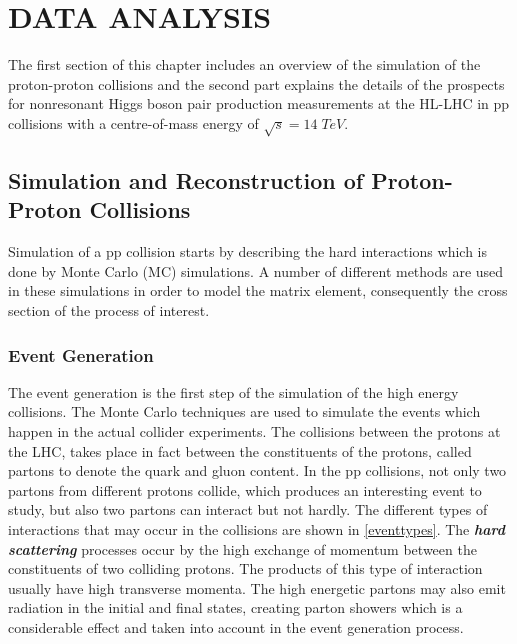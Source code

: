 \chapter{DATA ANALYSIS}\label{ch3}

The first section of this chapter includes an overview of the simulation of the proton-proton collisions and the second part explains the details of the prospects for nonresonant Higgs boson pair production measurements at the HL-LHC in pp collisions with a centre-of-mass energy of $\sqrt{s}=14\;TeV$.

\section{Simulation and Reconstruction of Proton-Proton Collisions}

Simulation of a pp collision starts by describing the hard interactions which is done by Monte Carlo (MC) simulations. A number of different methods are used in these simulations in order to model the matrix element, consequently the cross section of the process of interest. 

\subsection{Event Generation}

The event generation is the first step of the simulation of the high energy collisions. The Monte Carlo techniques are used to simulate the events which happen in the actual collider experiments. The collisions between the protons at the LHC, takes place in fact between the constituents of the protons, called partons to denote the quark and gluon content. In the pp collisions, not only two partons from different protons collide, which produces an interesting event to study, but also two partons can interact but not hardly. The different types of interactions that may occur in the collisions are shown in \autoref{eventtypes}. The \emph{\bf{hard scattering}} processes occur by the high exchange of momentum between the constituents of two colliding protons. The products of this type of interaction usually have high transverse momenta. The high energetic partons may also emit radiation in the initial and final states, creating parton showers which is a considerable effect and taken into account in the event generation process.

